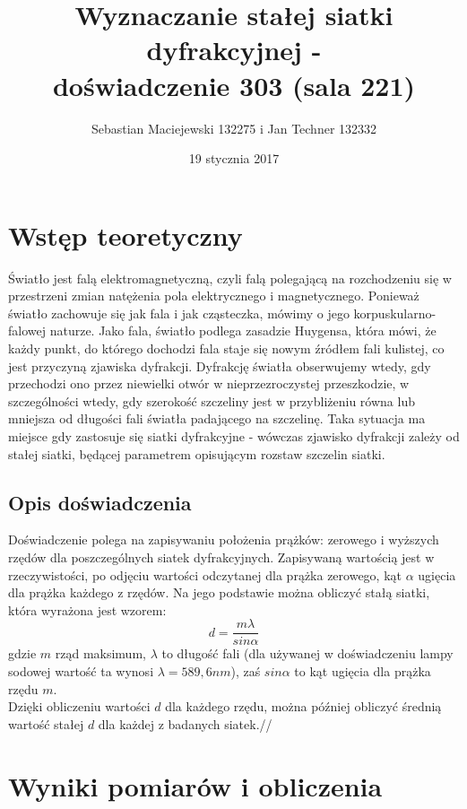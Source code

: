 \documentclass[10pt,a4paper]{article}
\author{Sebastian Maciejewski 132275 i Jan Techner 132332}
\title{Wyznaczanie stałej siatki dyfrakcyjnej - \\ doświadczenie 303 (sala 221)}
\date{19 stycznia 2017}
\newcommand{\forceindent}{\leavevmode{\parindent=3em\indent}}
\begin{document}
\maketitle
\section{Wstęp teoretyczny}
\forceindent Światło jest falą elektromagnetyczną, czyli falą polegającą na rozchodzeniu się w przestrzeni zmian natężenia pola elektrycznego i magnetycznego. Ponieważ światło 
zachowuje się jak fala i jak cząsteczka, mówimy o jego korpuskularno-falowej naturze. Jako fala, światło podlega zasadzie Huygensa, która mówi, że każdy punkt, do którego dochodzi fala
staje się nowym źródłem fali kulistej, co jest przyczyną zjawiska dyfrakcji. Dyfrakcję światła obserwujemy wtedy, gdy przechodzi ono przez niewielki otwór w nieprzezroczystej przeszkodzie, 
w szczególności wtedy, gdy szerokość szczeliny jest w przybliżeniu równa lub mniejsza od długości fali światła padającego na szczelinę.
Taka sytuacja ma miejsce gdy zastosuje się siatki dyfrakcyjne - wówczas zjawisko dyfrakcji zależy od stałej siatki, będącej parametrem opisującym rozstaw szczelin siatki.

\subsection*{Opis doświadczenia}
\forceindent Doświadczenie polega na zapisywaniu położenia prążków: zerowego i wyższych rzędów dla poszczególnych siatek dyfrakcyjnych. Zapisywaną wartością jest w rzeczywistości,
po odjęciu wartości odczytanej dla prążka zerowego, kąt $\alpha$ ugięcia dla prążka każdego z rzędów. Na jego podstawie można obliczyć stałą siatki, która wyrażona jest wzorem:
\begin{equation}
d=\frac{m\lambda}{sin\alpha}
\end{equation}
gdzie $m$ rząd maksimum, $\lambda$ to długość fali (dla używanej w doświadczeniu lampy sodowej wartość ta wynosi $\lambda = 589,6nm$), zaś $sin\alpha$ to kąt ugięcia dla prążka rzędu $m$.\\
Dzięki obliczeniu wartości $d$ dla każdego rzędu, można później obliczyć średnią wartość stałej $d$ dla każdej z badanych siatek.//

\newpage
\section{Wyniki pomiarów i obliczenia}
\end{document}
